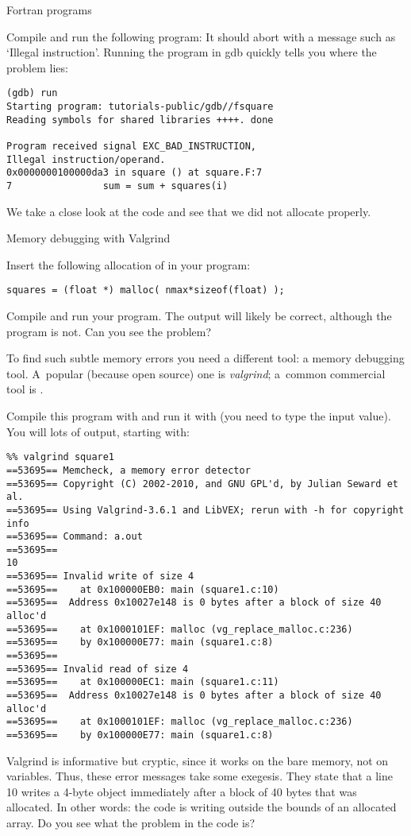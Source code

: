  {Fortran programs}

Compile and run the following program:
It should abort with a message such as `Illegal instruction'.
Running the program in gdb quickly tells you where the problem lies:
\begin{verbatim}
(gdb) run
Starting program: tutorials-public/gdb//fsquare 
Reading symbols for shared libraries ++++. done

Program received signal EXC_BAD_INSTRUCTION,
Illegal instruction/operand.
0x0000000100000da3 in square () at square.F:7
7                sum = sum + squares(i)
\end{verbatim}
We take a close look at the code and see that we did not allocate
 properly.

 {Memory debugging with Valgrind}
\label{sec:valgrind}

Insert the following allocation of  in your program:
\begin{verbatim}
squares = (float *) malloc( nmax*sizeof(float) );
\end{verbatim}
Compile and run your program. The output will likely be correct,
although the program is not. Can you see the problem?


To find such subtle memory errors you need a different tool: a memory
debugging tool. A~popular (because open source) one is
\emph{valgrind}; a~common commercial tool is .

%
Compile this program with  and run it with
 (you need to type the input value). You will lots
of output, starting with:
{\small
\begin{verbatim}
%% valgrind square1
==53695== Memcheck, a memory error detector
==53695== Copyright (C) 2002-2010, and GNU GPL'd, by Julian Seward et al.
==53695== Using Valgrind-3.6.1 and LibVEX; rerun with -h for copyright info
==53695== Command: a.out
==53695== 
10
==53695== Invalid write of size 4
==53695==    at 0x100000EB0: main (square1.c:10)
==53695==  Address 0x10027e148 is 0 bytes after a block of size 40 alloc'd
==53695==    at 0x1000101EF: malloc (vg_replace_malloc.c:236)
==53695==    by 0x100000E77: main (square1.c:8)
==53695== 
==53695== Invalid read of size 4
==53695==    at 0x100000EC1: main (square1.c:11)
==53695==  Address 0x10027e148 is 0 bytes after a block of size 40 alloc'd
==53695==    at 0x1000101EF: malloc (vg_replace_malloc.c:236)
==53695==    by 0x100000E77: main (square1.c:8)
\end{verbatim}
}
Valgrind is informative but cryptic, since it works on the bare
memory, not on variables. Thus, these error messages take some
exegesis. They state that a line 10 writes a 4-byte object immediately
after a block of 40 bytes that was allocated. In other words: the code
is writing outside the bounds of an allocated array. Do you see what
the problem in the code is?

